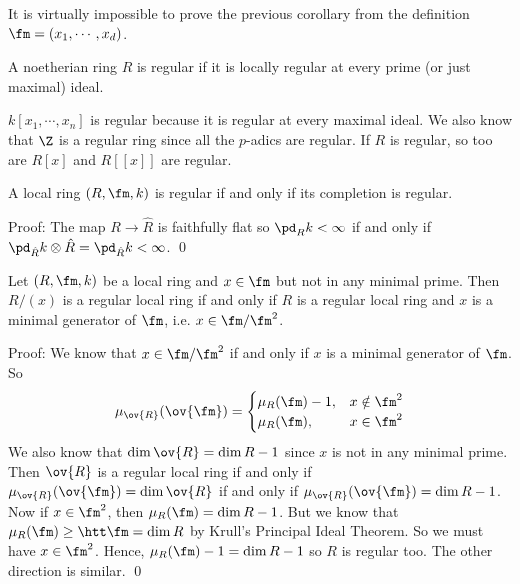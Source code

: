 \begin{rem}
It is virtually impossible to prove the previous corollary from the definition $\fm=(x_1,\cdots,x_d)$.
\end{rem}

\begin{dfn}
A noetherian ring $R$ is regular if it is locally regular at every prime (or just maximal) ideal.
\end{dfn}

\begin{ex}
$k[x_1,\cdots,x_n]$ is regular because it is regular at every maximal ideal. We also know that $\Z$ is a regular ring since all the $p$-adics are regular. If $R$ is regular, so too are $R[x]$ and $R[[x]]$ are regular. 
\end{ex}

\begin{cor}
A local ring $(R,\fm,k)$ is regular if and only if its completion is regular.
\end{cor}

\noindent Proof: The map $R \to \hat{R}$ is faithfully flat so $\pd_R k<\infty$ if and only if $\pd_{\hat{R}} k \otimes \hat{R}=\pd_{\hat{R}} k <\infty$. \qed \\

\begin{prop}
Let $(R,\fm,k)$ be a local ring and $x \in \fm$ but not in any minimal prime. Then $R/(x)$ is a regular local ring if and only if $R$ is a regular local ring and $x$ is a minimal generator of $\fm$, i.e. $x \in \fm/\fm^2$. 
\end{prop}

\noindent Proof: We know that $x \in \fm/\fm^2$ if and only if $x$ is a minimal generator of $\fm$. So 
\[
\mu_{\ov{R}}(\ov{\fm})=
\begin{cases}
\mu_R(\fm)-1, & x \notin \fm^2 \\
\mu_R(\fm), & x \in \fm^2
\end{cases}
\]
We also know that $\dim \ov{R}=\dim R-1$ since $x$ is not in any minimal prime. Then $\ov{R}$ is a regular local ring if and only if $\mu_{\ov{R}}(\ov{\fm})=\dim \ov{R}$ if and only if $\mu_{\ov{R}}(\ov{\fm})=\dim R-1$. Now if $x \in \fm^2$, then $\mu_R(\fm)=\dim R-1$. But we know that $\mu_R(\fm) \geq \htt \fm=\dim R$ by Krull's Principal Ideal Theorem. So we must have $x \in \fm^2$. Hence, $\mu_R(\fm)-1=\dim R-1$ so $R$ is regular too. The other direction is similar. \qed \\